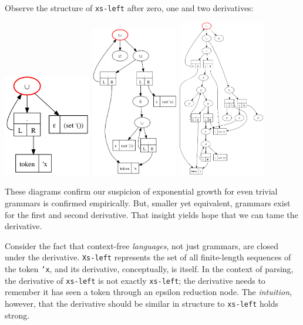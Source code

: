 Observe the structure of {\tt xs-left} after zero, one and two derivatives:
%
\begin{center}
 \includegraphics[width=1.5in]{xs-left-step-0.png}
 \includegraphics[width=1.5in]{xs-left-step-1.png}
 \includegraphics[width=1.5in]{xs-left-step-2.png}
\end{center}

These diagrams confirm our suspicion of exponential growth for even trivial
grammars is confirmed empirically.
%
But, smaller yet equivalent, grammars exist for the
first and second derivative.
%
That insight yields hope that we can tame the derivative.


%
Consider the fact that context-free \emph{languages}, not just grammars, are
closed under the derivative.
%
{\tt Xs-left} represents the set of all finite-length sequences of the token {\tt 'x}, and
its derivative, conceptually, is itself.
%
In the context of parsing, the derivative of {\tt xs-left} is not exactly {\tt xs-left}; the
derivative needs to remember it has seen a token through an epsilon reduction
node.
%
The \emph{intuition}, however, that the derivative should be similar in
structure to {\tt xs-left} holds strong.

